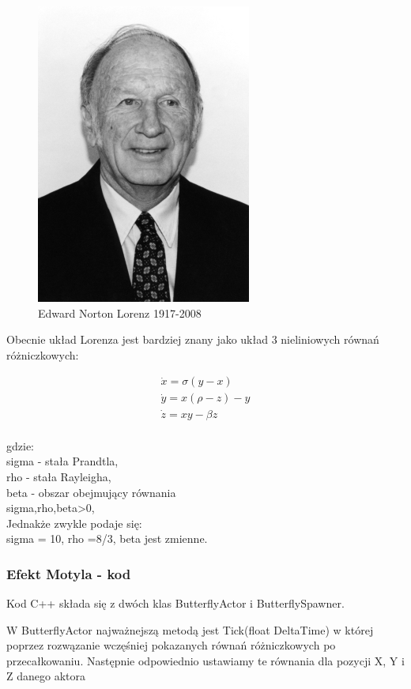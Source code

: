 \documentclass[a4paper,12pt,reqno]{article}
\begin{document}
\begin{figure}[H]%
\centering
\includegraphics[width=0.4\columnwidth]{graphics/Edward_lorenz.jpg}
\caption{Edward Norton Lorenz 1917-2008 
\label{BPExample}}%
%
\qquad
\end{figure} 

Obecnie układ Lorenza jest bardziej znany jako układ 3 nieliniowych
równań różniczkowych:

\begin{equation}
\begin{split}
\dot{x}=\sigma(y-x)\\
\dot{y}=x(\rho-z)-y\\
\dot{z}=xy-\beta z\\
\end{split}
\end{equation}

gdzie:\\
sigma - stała Prandtla,\\
rho - stała Rayleigha,\\
beta - obszar obejmujący równania\\
sigma,rho,beta>0,\\
Jednakże zwykle podaje się:\\
sigma = 10, rho =8/3, beta jest zmienne.\\

\subsubsection{Efekt Motyla - kod}

Kod C++ składa się z dwóch klas ButterflyActor i ButterflySpawner.

W ButterflyActor najważnejszą metodą jest Tick(float DeltaTime) w której poprzez rozwązanie wczęśniej pokazanych równań różniczkowych po przecałkowaniu. Następnie odpowiednio ustawiamy te równania dla pozycji X, Y i Z danego aktora\cite{motyle_cpp}
\end{document}
